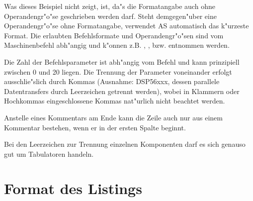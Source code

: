 \documentclass[12pt,a4paper,twoside]{report}
\begin{document}
Was dieses Beispiel nicht zeigt, ist, da"s die Formatangabe auch ohne
Operandengr"o"se geschrieben werden darf.  Steht demgegen"uber eine
Operandengr"o"se ohne Formatangabe, verwendet AS automatisch das
k"urzeste Format.  Die erlaubten Befehlsformate und Operandengr"o"sen
sind vom Maschinenbefehl abh"angig und k"onnen z.B. \cite{Tosh9000},
\cite{HitH8_5}, \cite{MitM16} bzw. \cite{MitM16C} entnommen werden.
\par
Die Zahl der Befehlsparameter ist abh"angig vom Befehl und kann
prinzipiell zwischen 0 und 20 liegen.  Die Trennung der Parameter
voneinander erfolgt ausschlie"slich durch Kommas (Ausnahme: DSP56xxx,
dessen parallele Datentransfers durch Leerzeichen getrennt werden),
wobei in Klammern oder Hochkommas eingeschlossene Kommas nat"urlich
nicht beachtet werden.
\par
Anstelle eines Kommentars am Ende kann die Zeile auch nur aus einem
Kommentar bestehen, wenn er in der ersten Spalte beginnt.
\par
Bei den Leerzeichen zur Trennung einzelnen Komponenten darf es sich
genauso gut um Tabulatoren handeln.


\section{Format des Listings}
\end{document}
